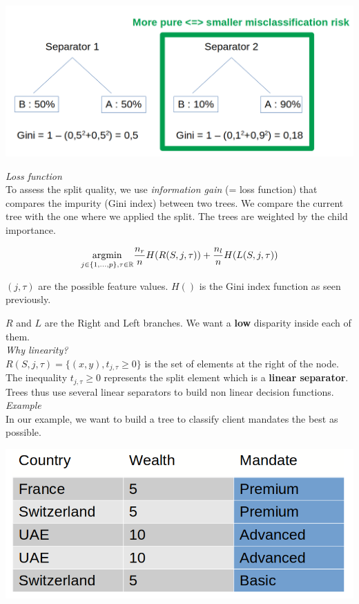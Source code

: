 \begin{center}
\includegraphics[scale=0.2]{tree_gini.png}
\end{center}

\textit{Loss function} \\

To assess the split quality, we use \textit{information gain} (= loss function) that compares the impurity (Gini index) between two trees. We compare the current tree with the one where we applied the split. The trees are weighted by the child importance.

$$\underset{j \in \{1,...,p\}, \\
\tau \in \mathbb{R}}{\operatorname{argmin}} \frac{n_r}{n}H(R(S,j,\tau))+\frac{n_l}{n}H(L(S,j,\tau))$$

$(j, \tau)$ are the possible feature values. $H()$ is the Gini index function as seen previously.

$R$ and $L$ are the Right and Left branches. We want a \textbf{low} disparity inside each of them. \\

\textit{Why linearity?} \\

$R(S,j,\tau)=\{(x,y), t_{j,\tau} \ge 0\}$ is the set of elements at the right of the node. The inequality $t_{j,\tau} \ge 0$ represents the split element which is a \textbf{linear separator}. Trees thus use several linear separators to build non linear decision functions. \\

\textit{Example} \\

In our example, we want to build a tree to classify client mandates the best as possible.

\includegraphics[scale=0.2]{trees_data.png}


